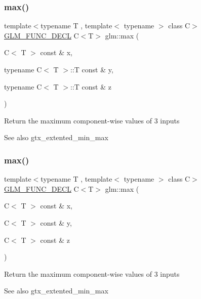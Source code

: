 \subsubsection{\texorpdfstring{max()}{max()}\hspace{0.1cm}{\footnotesize\ttfamily [2/6]}}
{\footnotesize\ttfamily template$<$typename T , template$<$ typename $>$ class C$>$ \\
\mbox{\hyperlink{setup_8hpp_ab2d052de21a70539923e9bcbf6e83a51}{G\+L\+M\+\_\+\+F\+U\+N\+C\+\_\+\+D\+E\+CL}} C$<$T$>$ glm\+::max (\begin{DoxyParamCaption}\item[{C$<$ T $>$ const \&}]{x,  }\item[{typename C$<$ T $>$\+::T const \&}]{y,  }\item[{typename C$<$ T $>$\+::T const \&}]{z }\end{DoxyParamCaption})}

Return the maximum component-\/wise values of 3 inputs \begin{DoxySeeAlso}{See also}
gtx\+\_\+extented\+\_\+min\+\_\+max 
\end{DoxySeeAlso}
\mbox{\label{group__gtx__extended__min__max_gaf832e9d4ab4826b2dda2fda25935a3a4}} 
\subsubsection{\texorpdfstring{max()}{max()}\hspace{0.1cm}{\footnotesize\ttfamily [3/6]}}
{\footnotesize\ttfamily template$<$typename T , template$<$ typename $>$ class C$>$ \\
\mbox{\hyperlink{setup_8hpp_ab2d052de21a70539923e9bcbf6e83a51}{G\+L\+M\+\_\+\+F\+U\+N\+C\+\_\+\+D\+E\+CL}} C$<$T$>$ glm\+::max (\begin{DoxyParamCaption}\item[{C$<$ T $>$ const \&}]{x,  }\item[{C$<$ T $>$ const \&}]{y,  }\item[{C$<$ T $>$ const \&}]{z }\end{DoxyParamCaption})}

Return the maximum component-\/wise values of 3 inputs \begin{DoxySeeAlso}{See also}
gtx\+\_\+extented\+\_\+min\+\_\+max 
\end{DoxySeeAlso}
\mbox{\label{group__gtx__extended__min__max_ga78e04a0cef1c4863fcae1a2130500d87}} 

